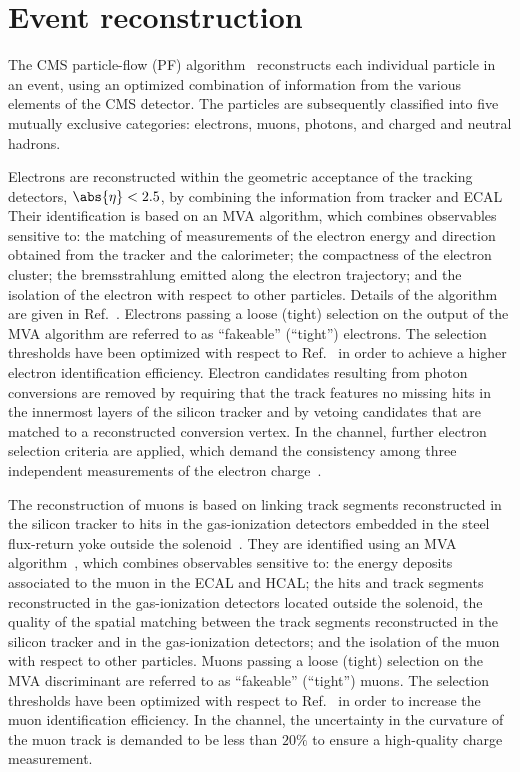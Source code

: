 \section{Event reconstruction}
\label{sec:eventReconstruction}

The CMS particle-flow (PF) algorithm~\cite{Sirunyan:2017ulk} reconstructs each individual particle in an event,
using an optimized combination of information from the various elements of the CMS detector.
The particles are subsequently classified into five mutually exclusive categories: 
electrons, muons, photons, and charged and neutral hadrons.

Electrons are reconstructed within the geometric acceptance of the tracking detectors, $\abs{\eta} < 2.5$,
by combining the information from tracker and ECAL~\cite{Khachatryan:2015hwa}
Their identification is based on an MVA algorithm, which combines observables sensitive 
to: the matching of measurements of the electron energy and direction obtained from the tracker and the calorimeter;
the compactness of the electron cluster;
the bremsstrahlung emitted along the electron trajectory;
and the isolation of the electron with respect to other particles.
Details of the algorithm are given in Ref.~\cite{Sirunyan:2020icl}.
Electrons passing a loose (tight) selection on the output of the MVA algorithm are referred to as ``fakeable'' (``tight'') electrons.
The selection thresholds have been optimized with respect to Ref.~\cite{Sirunyan:2020icl} in order to achieve a higher electron identification efficiency.
Electron candidates resulting from photon conversions are removed by requiring 
that the track features no missing hits in the innermost layers of the silicon tracker and by vetoing candidates that are matched to a reconstructed conversion vertex.
In the \twoLeptonssZeroTau channel, further electron selection criteria are applied,
which demand the consistency among three independent measurements of the electron charge~\cite{Khachatryan:2015hwa}.

The reconstruction of muons is based on linking track segments reconstructed in the silicon tracker 
to hits in the gas-ionization detectors embedded in the steel flux-return yoke outside the solenoid~\cite{Sirunyan:2018}.
They are identified using an MVA algorithm~\cite{Sirunyan:2020icl}, which combines observables sensitive 
to: the energy deposits associated to the muon in the ECAL and HCAL;
the hits and track segments reconstructed in the gas-ionization detectors located outside the solenoid,
the quality of the spatial matching between the track segments reconstructed in the silicon tracker and in the gas-ionization detectors;
and the isolation of the muon with respect to other particles.
Muons passing a loose (tight) selection on the MVA discriminant are referred to as ``fakeable'' (``tight'') muons.
The selection thresholds have been optimized with respect to Ref.~\cite{Sirunyan:2020icl} in order to increase the muon identification efficiency.
In the \twoLeptonssZeroTau channel, the uncertainty in the curvature of the muon track is demanded to be less than $20\%$
to ensure a high-quality charge measurement.


